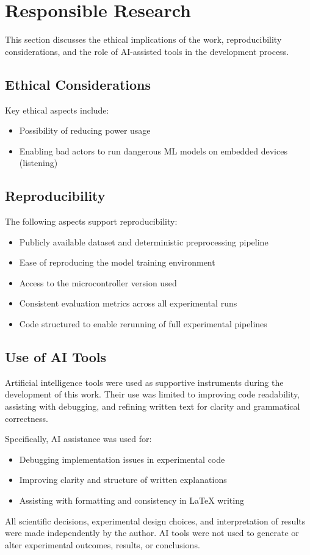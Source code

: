 \section{Responsible Research}

This section discusses the ethical implications of the work, reproducibility considerations, and the role of AI-assisted tools in the development process.

\subsection{Ethical Considerations}

Key ethical aspects include:
\begin{itemize}
  \item Possibility of reducing power usage
  \item Enabling bad actors to run dangerous ML models on embedded devices (listening)
\end{itemize}

\subsection{Reproducibility}

The following aspects support reproducibility:
\begin{itemize}
  \item Publicly available dataset and deterministic preprocessing pipeline
  \item Ease of reproducing the model training environment
  \item Access to the microcontroller version used
  \item Consistent evaluation metrics across all experimental runs
  \item Code structured to enable rerunning of full experimental pipelines
\end{itemize}

\subsection{Use of AI Tools}

Artificial intelligence tools were used as supportive instruments during the development of this work. Their use was limited to improving code readability, assisting with debugging, and refining written text for clarity and grammatical correctness. \

Specifically, AI assistance was used for:
\begin{itemize}
  \item Debugging implementation issues in experimental code
  \item Improving clarity and structure of written explanations
  \item Assisting with formatting and consistency in LaTeX writing
\end{itemize}

All scientific decisions, experimental design choices, and interpretation of results were made independently by the author. AI tools were not used to generate or alter experimental outcomes, results, or conclusions.
